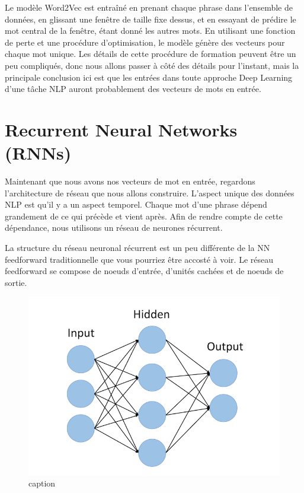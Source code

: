 \documentclass[11pt]{article}
\makeatletter
\def\maxwidth{\ifdim\Gin@nat@width>\linewidth\linewidth
    \else\Gin@nat@width\fi}
\let\Oldincludegraphics\includegraphics
\renewcommand{\includegraphics}[1]{\Oldincludegraphics[width=.8\maxwidth]{#1}}
\makeatother
\begin{document}
Le modèle Word2Vec est entraîné en prenant chaque phrase dans l'ensemble
de données, en glissant une fenêtre de taille fixe dessus, et en
essayant de prédire le mot central de la fenêtre, étant donné les autres
mots. En utilisant une fonction de perte et une procédure
d'optimisation, le modèle génère des vecteurs pour chaque mot unique.
Les détails de cette procédure de formation peuvent être un peu
compliqués, donc nous allons passer à côté des détails pour l'instant,
mais la principale conclusion ici est que les entrées dans toute
approche Deep Learning d'une tâche NLP auront probablement des vecteurs
de mots en entrée.

    \section{Recurrent Neural Networks
(RNNs)}\label{recurrent-neural-networks-rnns}

    Maintenant que nous avons nos vecteurs de mot en entrée, regardons
l'architecture de réseau que nous allons construire. L'aspect unique des
données NLP est qu'il y a un aspect temporel. Chaque mot d'une phrase
dépend grandement de ce qui précède et vient après. Afin de rendre
compte de cette dépendance, nous utilisons un réseau de neurones
récurrent.

La structure du réseau neuronal récurrent est un peu différente de la NN
feedforward traditionnelle que vous pourriez être accosté à voir. Le
réseau feedforward se compose de noeuds d'entrée, d'unités cachées et de
noeuds de sortie.

\begin{figure}
\centering
\includegraphics{Images/SentimentAnalysis17.png}
\caption{caption}
\end{figure}
\end{document}
